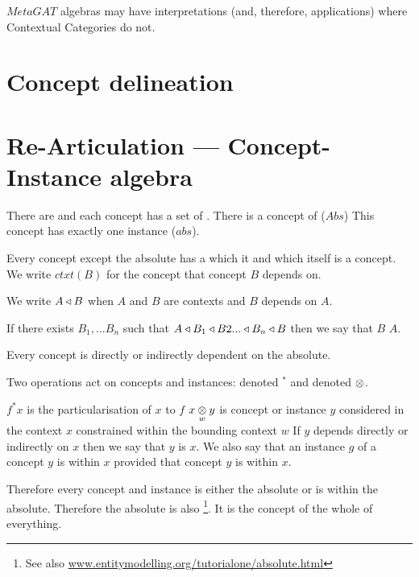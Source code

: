 \documentclass[10pt,a4paper]{article}
\begin{document}
\noindent $MetaGAT$ algebras may have interpretations (and, therefore, applications) where Contextual Categories do not.

\section{Concept delineation}

\section{Re-Articulation ---  Concept-Instance algebra}

\note
There are  and each concept has a set of . There is a concept of ($Abs$)
 This concept has exactly one instance ($abs$). 

\note
Every concept except the absolute has a  which it  and which itself is a concept. 
We write $ctxt(B)$
for the  concept that concept $B$ depends on.

We write $A \base B$  when  $A$ and $B$ are contexts and $B$ depends on $A$.

\note
If there exists $B_1,...B_n$ such that
$A \base B_1 \base B2 ... \base B_n \base B$ then we say that $B$  $A$.

\note Every concept is directly or indirectly dependent on the absolute.

\note
Two operations act on concepts and instances:  denoted
$^*$ and   denoted $\cross$.

\note
$f^*x$ is the particularisation of $x$ to $f$
\note
$\crossx{x}{y}{w}$ is concept or instance $y$ considered in the context $x$ constrained within the bounding context $w$
\note
If $y$ depends directly or indirectly on $x$ then we say that $y$ is  $x$.
We also say that an instance $g$ of a concept $y$ is within $x$ provided that concept $y$ is within $x$.

\note 
Therefore every concept and instance is either the absolute or is within the absolute.
Therefore the absolute  is also \footnote{See also \url{www.entitymodelling.org/tutorialone/absolute.html}}. It is the concept of the whole of everything.
\end{document}
